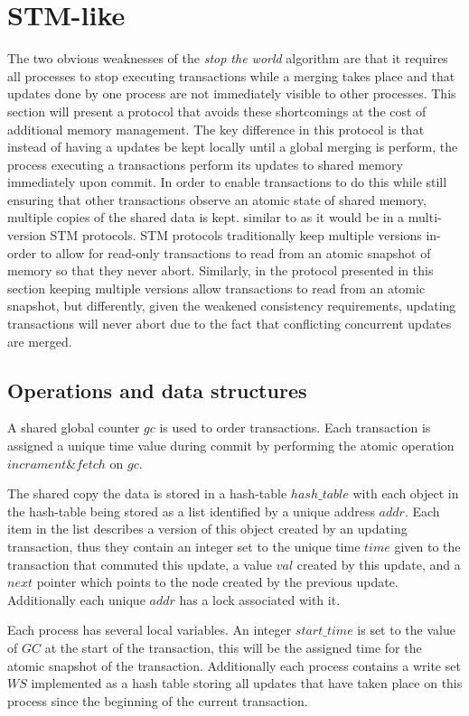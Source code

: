 \documentclass[11pt,letterpaper]{article}
\begin{document}
\section{STM-like}
The two obvious weaknesses of the \emph{stop the world} algorithm are that
it requires all processes to stop executing transactions while a merging takes place
and that updates done by one process are not immediately visible to other processes.
This section will present a protocol that avoids these shortcomings at the cost
of additional memory management.
The key difference in this protocol is that instead of having a updates be kept
locally until a global merging is perform, the process executing a transactions
perform its updates to shared memory immediately upon commit.
In order to enable transactions to do this while still ensuring that other transactions
observe an atomic state of shared memory, multiple copies of the shared data is kept.
similar to as it would be in a multi-version STM protocols.
STM protocols traditionally keep multiple versions in-order to allow for read-only transactions
to read from an atomic snapshot of memory so that they never abort.
Similarly, in the protocol presented in this section keeping multiple versions allow transactions to read
from an atomic snapshot, but differently, given the weakened consistency requirements, updating transactions
will never abort due to the fact that conflicting concurrent updates are merged.

\subsection{Operations and data structures}
A shared global counter $\mathit{gc}$ is used to order transactions.
Each transaction is assigned a unique time value during commit by performing the atomic
operation $\mathit{incrament\&fetch}$ on $\mathit{gc}$.


The shared copy the data is stored in a hash-table
$\mathit{hash\_table}$ with each object in the hash-table
being stored as a list identified by a unique address $\mathit{addr}$.
Each item in the list describes a version of this object created
by an updating transaction, thus they contain an integer
set to the unique time $\mathit{time}$ given to the transaction that commuted this
update, a value $\mathit{val}$ created by this update, and a $\mathit{next}$ pointer
which points to the node created by the previous update.
Additionally each unique $\mathit{addr}$ has a lock associated with it.


Each process has several local variables.
An integer $\mathit{start\_time}$ is set to the value of $\mathit{GC}$
at the start of the transaction,
this will be the assigned time for the atomic snapshot of the transaction.
Additionally each process contains a write set $\mathit{WS}$
implemented as a hash table
storing all updates that have taken place on this process
since the beginning of the current transaction.
\end{document}
